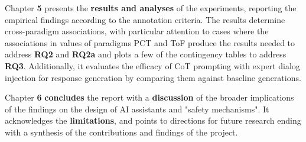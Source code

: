 \bigskip Chapter \textbf{5} presents the \textbf{results and analyses} of the experiments, reporting the empirical findings according to the annotation criteria. The results determine cross-paradigm associations, with particular attention to cases where the associations in values of paradigms PCT and ToF produce the results needed to address \textbf{RQ2} and \textbf{RQ2a} and plots a few of the contingency tables to address \textbf{RQ3}. Additionally, it evaluates the efficacy of CoT prompting with expert dialog injection for response generation by comparing them against baseline generations.

\bigskip Chapter \textbf{6} \textbf{concludes} the report with a \textbf{discussion} of the broader implications of the findings on the design of AI assistants and "safety mechanisms". It acknowledges the \textbf{limitations}, and points to directions for future research ending with a synthesis of the contributions and findings of the project.
